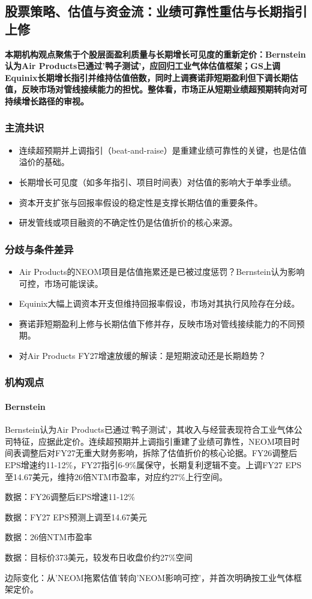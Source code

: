 \documentclass[11pt]{ctexart}
\begin{document}
\subsection{股票策略、估值与资金流：业绩可靠性重估与长期指引上修}
\textbf{本期机构观点聚焦于个股层面盈利质量与长期增长可见度的重新定价：Bernstein认为Air Products已通过'鸭子测试'，应回归工业气体估值框架；GS上调Equinix长期增长指引并维持估值倍数，同时上调赛诺菲短期盈利但下调长期估值，反映市场对管线接续能力的担忧。整体看，市场正从短期业绩超预期转向对可持续增长路径的审视。}
\subsubsection*{主流共识}
\begin{itemize}
  \item 连续超预期并上调指引（beat-and-raise）是重建业绩可靠性的关键，也是估值溢价的基础。
  \item 长期增长可见度（如多年指引、项目时间表）对估值的影响大于单季业绩。
  \item 资本开支扩张与回报率假设的稳定性是支撑长期估值的重要条件。
  \item 研发管线或项目融资的不确定性仍是估值折价的核心来源。
\end{itemize}
\subsubsection*{分歧与条件差异}
\begin{itemize}
  \item Air Products的NEOM项目是估值拖累还是已被过度惩罚？Bernstein认为影响可控，市场可能误读。
  \item Equinix大幅上调资本开支但维持回报率假设，市场对其执行风险存在分歧。
  \item 赛诺菲短期盈利上修与长期估值下修并存，反映市场对管线接续能力的不同预期。
  \item 对Air Products FY27增速放缓的解读：是短期波动还是长期趋势？
\end{itemize}
\subsubsection*{机构观点}
\paragraph{Bernstein} Bernstein认为Air Products已通过'鸭子测试'，其收入与经营表现符合工业气体公司特征，应据此定价。连续超预期并上调指引重建了业绩可靠性，NEOM项目时间表调整后对FY27无重大财务影响，拆除了估值折价的核心论据。FY26调整后EPS增速约11-12\%，FY27指引6-9\%属保守，长期复利逻辑不变。上调FY27 EPS至14.67美元，维持26倍NTM市盈率，对应约27\%上行空间。
{\small\color{refgray}数据：FY26调整后EPS增速11-12\%\par}
{\small\color{refgray}数据：FY27 EPS预测上调至14.67美元\par}
{\small\color{refgray}数据：26倍NTM市盈率\par}
{\small\color{refgray}数据：目标价373美元，较发布日收盘价约27\%空间\par}
{\small\color{refgray}边际变化：从'NEOM拖累估值'转向'NEOM影响可控'，并首次明确按工业气体框架定价。\par}
\end{document}
